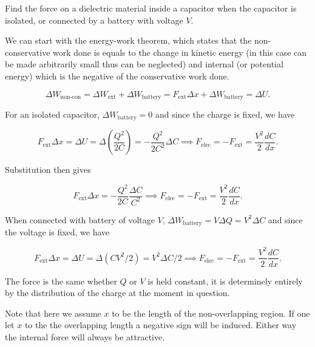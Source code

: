 \documentclass[english,a4paper,12pt]{report}
\begin{document}
{Find the force on a dielectric material inside a capacitor when the capacitor is isolated, or connected by a battery with voltage \(V\).}
{We can start with the energy-work theorem, which states that the non-conservative work done is equals to the change in kinetic energy (in this case can be made arbitrarily small thus can be neglected) and internal (or potential energy) which is the negative of the conservative work done.

\begin{equation}
    \Delta W_{\text{non-con} }  = \Delta W_{\text{ext} } + \Delta W_{\text{battery}} = F_{\text{ext} }\Delta x  + \Delta W_{\text{battery} } = \Delta U.
\end{equation}

For an isolated capacitor, \(\Delta W_{\text{battery} } = 0 \) and since the charge is fixed, we have

\begin{equation}
    F_{\text{ext} }\Delta x = \Delta U = \Delta \left( \frac{Q^2}{2C}  \right) = -\frac{Q^2}{2C^2}\Delta C \implies F_{\text{elec} } = -F_{\text{ext} } =  \frac{V^2}{2}\frac{dC}{dx}.  
\end{equation}

Substitution then gives

\begin{equation}
    F_{\text{ext} }\Delta x = -\frac{Q^2}{2C}\frac{\Delta C}{C^2} \implies F_{\text{elec} } = - F_{\text{ext} } = \frac{V^2}{2}\frac{dC}{dx}.    
\end{equation}

When connected with battery of voltage \(V\), \(\Delta W_{\text{battery} } = V \Delta Q = V^2\Delta C\) and since the voltage is fixed, we have 

\begin{equation}
    F_{\text{ext} }\Delta x = \Delta U = \Delta \left( CV^2/2 \right) = V^2\Delta C /2 \implies F_{\text{elec} } = -F_{\text{ext} } = \frac{V^2}{2}\frac{dC}{dx}.   
\end{equation}

The force is the same whether \(Q \text { or } V\) is held constant, it is determinely entirely by the distribution of the charge at the moment in question.  

Note that here we assume \(x\) to be the length of the non-overlapping region. If one let \(x\) to the the overlapping length a negative sign will be induced. Either way the internal force will always be attractive.
} 
\end{document}
